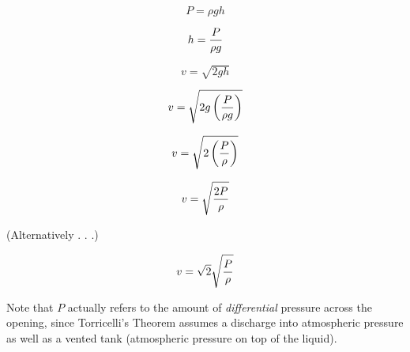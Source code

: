 $$P = \rho g h$$

$$h = {P \over \rho g}$$

\vskip 10pt

$$v = \sqrt{2 g h}$$

$$v = \sqrt{2 g \left(P \over \rho g \right)}$$

$$v = \sqrt{2 \left(P \over \rho \right)}$$

$$v = \sqrt{2 P \over \rho}$$

\centerline{(Alternatively . . .)}
 
$$v = \sqrt{2} \sqrt{P \over \rho}$$

Note that $P$ actually refers to the amount of {\it differential} pressure across the opening, since Torricelli's Theorem assumes a discharge into atmospheric pressure as well as a vented tank (atmospheric pressure on top of the liquid).











